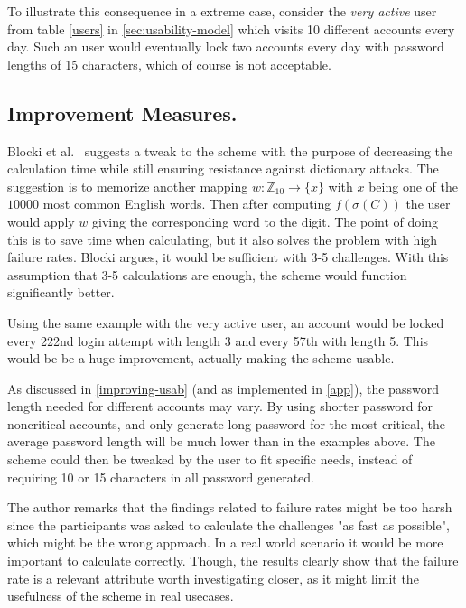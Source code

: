 \par To illustrate this consequence in a extreme case, consider the \emph{very active} user from table \ref{users} in \autoref{sec:usability-model} which visits 10 different accounts every day. Such an user would eventually lock two accounts every day with password lengths of 15 characters, which of course is not acceptable.


\subsection{Improvement Measures.}
\par Blocki et al.~\cite{hcp-blocki} suggests a tweak to the scheme with the purpose of decreasing the calculation time while still ensuring resistance against dictionary attacks. The suggestion is to memorize another mapping $w:\mathbb{Z}_{10} \rightarrow \{x\}$ with $x$ being one of the $10000$ most common English words. Then after computing $f(\sigma(C))$ the user would apply $w$ giving the corresponding word to the digit. The point of doing this is to save time when calculating, but it also solves the problem with high failure rates. Blocki argues, it would be sufficient with 3-5 challenges. With this assumption that 3-5 calculations are enough, the scheme would function significantly better. 
\par Using the same example with the very active user, an account would be locked every 222nd login attempt with length 3 and every 57th with length 5. This would be be a huge improvement, actually making the scheme usable.

\par As discussed in \autoref{improving-usab} (and as implemented in \autoref{app}), the password length needed for different accounts may vary. By using shorter password for noncritical accounts, and only generate long password for the most critical, the average password length will be much lower than in the examples above. The scheme could then be tweaked by the user to fit specific needs, instead of requiring 10 or 15 characters in all password generated. 

\begin{remark}
    The author remarks that the findings related to failure rates might be too harsh since the participants was asked to calculate the challenges "as fast as possible", which might be the wrong approach. In a real world scenario it would be more important to calculate correctly. Though, the results clearly show that the failure rate is a relevant attribute worth investigating closer, as it might limit the usefulness of the scheme in real usecases.
\end{remark}




